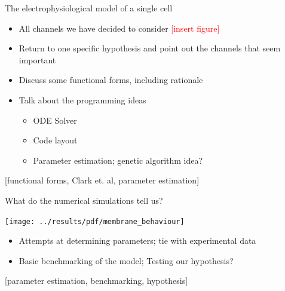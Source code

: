 \documentclass[ignorenonframetext]{beamer}
\newcommand{\references}[1] {
  \begin{flushright}
    \scriptsize [#1] \normalsize
  \end{flushright}
}
\newcommand{\addfigure} {
  \scriptsize
  \textcolor{red}{[insert figure]}
  \normalsize
}
\begin{document}
\begin{frame}{The electrophysiological model of a single cell}

  \begin{itemize}
  \item All channels we have decided to consider \addfigure %
  \item Return to one specific hypothesis and point out the channels
    that seem important %
  \item Discuss some functional forms, including rationale
  \item Talk about the programming ideas
    \begin{itemize}
      \item ODE Solver
      \item Code layout
      \item Parameter estimation; genetic algorithm idea?
    \end{itemize}
  \end{itemize}

  \references{functional forms, Clark et. al, parameter estimation}

\end{frame}

%

\begin{frame}{What do the numerical simulations tell us?}

  \texttt{[image: ../results/pdf/membrane\_behaviour]}

  \begin{itemize}
  \item Attempts at determining parameters; tie with experimental data
  \item Basic benchmarking of the model; Testing our hypothesis?
  \end{itemize}

  \references{parameter estimation, benchmarking, hypothesis}

\end{frame}

\end{document}
